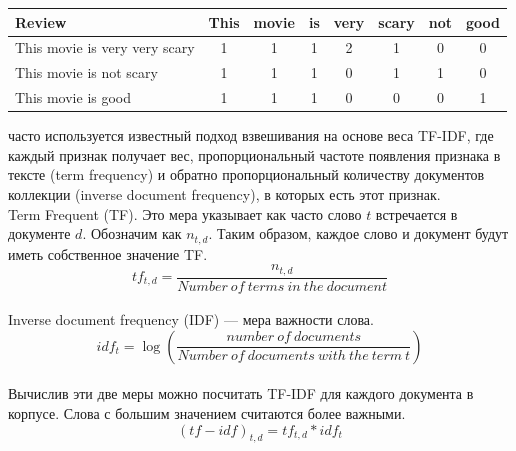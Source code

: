 \documentclass{article}
\newcommand\tab[1][1cm]{\hspace*{#1}}
\begin{document}
\begin{center}
\begin{tabular}{||с | c | c | c | c | c | c | c||} 
\hline
 Review &  This & movie & is & very & scary & not & good\\ [0.5ex] 
 \hline\hline
 This movie is very very scary & 1 & 1 & 1 & 2 & 1 & 0 & 0 \\ 
 \hline
 This movie is not scary & 1 & 1 & 1 & 0 & 1 & 1 & 0  \\
 \hline
 This movie is good & 1 & 1 & 1 & 0 & 0 & 0 & 1 \\ [1ex] 
 \hline
\end{tabular}
\end{center} 
 часто используется известный подход взвешивания на основе веса TF-IDF, где каждый признак получает вес, пропорциональный частоте появления признака в тексте (term frequency) и обратно пропорциональный количеству документов коллекции (inverse document frequency), в которых есть этот признак. \\
 Term Frequent (TF). Это мера указывает как часто слово $t$ встречается в документе $d$. Обозначим как $n_{t,d}$. Таким образом, каждое слово и документ будут иметь собственное значение TF.\\
$$tf_{t,d} = \frac{n_{t,d}}{Number\:of\:terms\:in\:the\:document}$$\\
\tab Inverse document frequency (IDF) — мера важности слова.\\
$$idf_{t} = \log\left(\frac{number\:of\:documents}{Number\:of\:documents\:with\:the\:term\:t}\right)$$\\
\tab Вычислив эти две меры можно посчитать TF-IDF для каждого документа в корпусе. Слова с большим значением считаются более важными.\\
$$(tf-idf)_{t,d} = tf_{t,d}*idf_{t}$$\\
\end{document}
